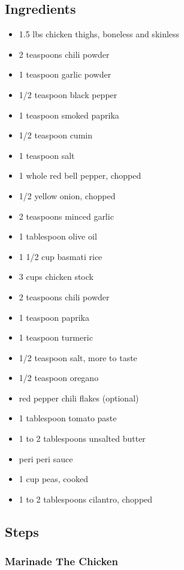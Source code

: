 \documentclass[
]{article}
\providecommand{\tightlist}{%
  \setlength{\itemsep}{0pt}\setlength{\parskip}{0pt}}
\begin{document}
\hypertarget{ingredients}{%
\subsection{Ingredients}\label{ingredients}}

\begin{itemize}
\tightlist
\item
  1.5 lbs chicken thighs, boneless and skinless
\item
  2 teaspoons chili powder
\item
  1 teaspoon garlic powder
\item
  1/2 teaspoon black pepper
\item
  1 teaspoon smoked paprika
\item
  1/2 teaspoon cumin
\item
  1 teaspoon salt
\item
  1 whole red bell pepper, chopped
\item
  1/2 yellow onion, chopped
\item
  2 teaspoons minced garlic
\item
  1 tablespoon olive oil
\item
  1 1/2 cup basmati rice
\item
  3 cups chicken stock
\item
  2 teaspoons chili powder
\item
  1 teaspoon paprika
\item
  1 teaspoon turmeric
\item
  1/2 teaspoon salt, more to taste
\item
  1/2 teaspoon oregano
\item
  red pepper chili flakes (optional)
\item
  1 tablespoon tomato paste
\item
  1 to 2 tablespoons unsalted butter
\item
  peri peri sauce
\item
  1 cup peas, cooked
\item
  1 to 2 tablespoons cilantro, chopped
\end{itemize}

\hypertarget{steps}{%
\subsection{Steps}\label{steps}}

\hypertarget{marinade-the-chicken}{%
\subsubsection{Marinade The Chicken}\label{marinade-the-chicken}}
\end{document}
